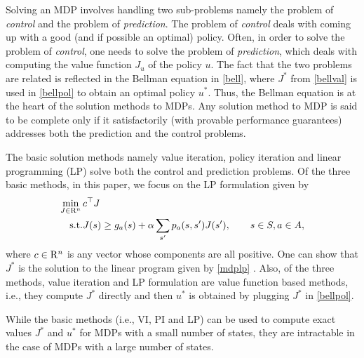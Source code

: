 Solving an MDP involves handling two sub-problems namely the problem of \emph{control} and the problem of \emph{prediction}. The problem of \emph{control} deals with coming up with a good (and if possible an optimal) policy. Often, in order to solve the problem of \emph{control}, one needs to solve the problem of \emph{prediction}, which deals with computing the value function $J_u$ of the policy $u$. The fact that the two problems are related is reflected in the Bellman equation in \eqref{bell}, where $J^*$ from \eqref{bellval} is used in \eqref{bellpol} to obtain an optimal policy $u^*$. Thus, the Bellman equation is at the heart of the solution methods to MDPs. Any solution method to MDP is said to be complete only if it satisfactorily (with provable performance guarantees) addresses both the prediction and the control problems. 

The basic solution methods namely value iteration, policy iteration and linear programming (LP) \cite{BertB} solve both the control and prediction problems. Of the three basic methods, in this paper, we focus on the LP formulation given by
\begin{align}\label{mdplp}
\begin{split}
\min_{J\in \R^n}\, &c^\top J\\
\text{s.t.}\mb &J(s)\geq g_a(s)+\alpha\sum_{s'}p_a(s,s')J(s'), \qquad s\in S, a \in A,
\end{split}
\end{align}
where $c\in \mathrm{R}^n$ is any vector whose components are all positive.
One can show that $J^*$ is the solution to the linear program given by \eqref{mdplp} \cite{BertB}. 
Also, of the three methods, value iteration and LP formulation are value function based methods, i.e., they compute $J^*$ directly and then $u^*$ is obtained by plugging $J^*$ in \eqref{bellpol}.

While the basic methods (i.e., VI, PI and LP) can be used to compute exact values $J^*$ and $u^*$ for MDPs with a small number of states, they are intractable in the case of MDPs with a large number of states.
